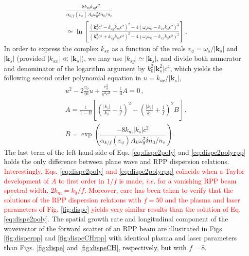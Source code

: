 \documentclass[
 reprint,
 amsmath,amssymb,
 aps,
]{revtex4-1}
\begin{document}
\begin{align}
 \frac{-8k_mk_{sy}c^2}{\alpha_{k/f}(v_\phi)A_k \omega_0^2\delta n_0/n_c  } \nonumber\\
 \simeq  \ln\left[
 \frac{ (\mathbf{k}_s^2c^2-k_{sy} k_m c^2)^2 -4(\omega_s\omega_0 - k_{sx}k_0 c^2)^2}{ (\mathbf{k}_s^2c^2+k_{sy} k_m c^2)^2 -4(\omega_s\omega_0 - k_{sx}k_0 c^2)^2} \right] \, .\label{eq:disperpp2} 
\end{align}
In order to express the complex $k_{sx}$ as a function of the reals $v_\phi=\omega_s/\vert \mathbf{k}_s\vert $ and $\vert \mathbf{k}_s\vert $ (provided  $\vert k_{sx}\vert \ll \vert \mathbf{k}_s\vert$), we may use $\vert k_{sy} \vert  \simeq \vert \mathbf{k}_s\vert$, and divide both numerator and denominator of the logarithm argument by $k_0^2\vert \mathbf{k}_s^2\vert c^4$, which yields the following second order polynomial equation in $u =  k_{sx}/\vert \mathbf{k}_s\vert$,
\begin{align}
u^2 -2\frac{v_\phi}{\eta c}u +\frac{v_\phi^2}{\eta^2 c^2}-\frac{1}{4}A =0 
\, , \nonumber\\
A= \frac{1}{1-B}\left[ \left(\frac{\vert k_{s}\vert}{k_0}-\frac{1}{f}\right)^2-\left(\frac{\vert k_{s}\vert}{k_0}+\frac{1}{f}\right)^2B  \right]\, , \nonumber \\ 
B =\exp\left(\dfrac{-8k_m \vert k_{s}\vert c^2}{\alpha_{k/f}(v_\phi)A_k \omega_0^2\delta n_0/n_c  }\right)\, . \label{eq:dispe2polyrpp} 
\end{align}
The last term of the left hand side of  Eqs. \eqref{eq:dispe2poly} and \eqref{eq:dispe2polyrpp} holds the only difference between plane wave and RPP dispersion relations. 
\textcolor{red}{
Interestingly,  Eqs.   \eqref{eq:dispe2poly} and     \eqref{eq:dispe2polyrpp} co\"incide when  a Taylor development of $A$ to first order  in $1/f$ is made, \emph{i.e.} for a vanishing  RPP beam spectral width, $2k_m=k_0/f$. Moreover, care has been taken to verify that the solutions of the RPP dispersion relations with  $f = 50$ and the plasma and laser parameters of Fig. \ref{fig:dispe} yields  very similar results than the solution of Eq. \eqref{eq:dispe2poly}.
}
The spatial growth rate and longitudinal component of the wavevector of the forward scatter of an RPP beam are illustrated in  
Figs. \ref{fig:disperpp} and \ref{fig:dispeCHrpp} with identical plasma and laser parameters than Figs.  \ref{fig:dispe} and \ref{fig:dispeCH}, respectively, but with $f=8$.
\end{document}

